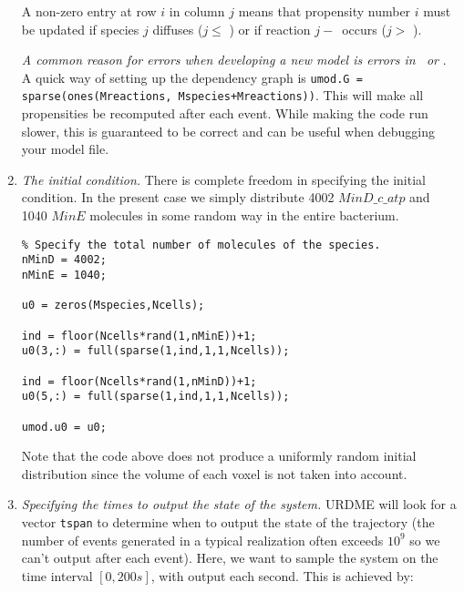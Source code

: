 \begin{enumerate}
A non-zero entry at row $i$ in column $j$ means that propensity number
$i$ must be updated if species $j$ diffuses ($j \leq $ \varMspecies)
or if reaction $j-$\varMspecies\ occurs ($j > $ \varMspecies).

{\color{red}{{\bf !}}} \emph{A common reason for errors when
  developing a new model is errors in \varN\ or \varG}. A quick way of
setting up the dependency graph is \texttt{umod.G =
  sparse(ones(Mreactions, Mspecies+Mreactions))}. This will make all
propensities be recomputed after each event. While making the code run
slower, this is guaranteed to be correct and can be useful when
debugging your model file.

\item \emph{The initial condition.} There is complete freedom in
  specifying the initial condition. In the present case we simply
  distribute 4002 $MinD\_c\_{atp}$ and 1040 $MinE$ molecules in some
  random way in the entire bacterium.






\begin{verbatim}
% Specify the total number of molecules of the species. 
nMinD = 4002;
nMinE = 1040;

u0 = zeros(Mspecies,Ncells);

ind = floor(Ncells*rand(1,nMinE))+1;
u0(3,:) = full(sparse(1,ind,1,1,Ncells));

ind = floor(Ncells*rand(1,nMinD))+1;
u0(5,:) = full(sparse(1,ind,1,1,Ncells));

umod.u0 = u0;
\end{verbatim}

  Note that the code above does not produce a uniformly random initial
  distribution since the volume of each voxel is not taken into
  account.

\item \emph{Specifying the times to output the state of the system.}
  URDME will look for a vector \texttt{tspan} to determine when to
  output the state of the trajectory (the number of events generated
  in a typical realization often exceeds $10^9$ so we can't output
  after each event). Here, we want to sample the system on the time
  interval $[0,200s]$, with output each second. This is achieved by:


\end{enumerate}
